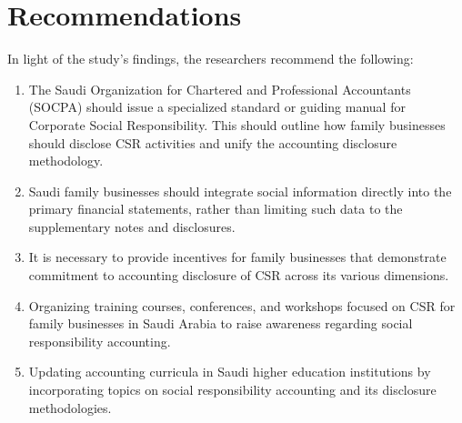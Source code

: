 \documentclass{NSP1}
\begin{document}
\section{Recommendations}
In light of the study's findings, the researchers recommend the following:
\begin{enumerate}
\item The Saudi Organization for Chartered and Professional Accountants (SOCPA) should issue a specialized standard or guiding manual for Corporate Social Responsibility. This should outline how family businesses should disclose CSR activities and unify the accounting disclosure methodology.
\item Saudi family businesses should integrate social information directly into the primary financial statements, rather than limiting such data to the supplementary notes and disclosures.
\item It is necessary to provide incentives for family businesses that demonstrate commitment to accounting disclosure of CSR across its various dimensions.
\item Organizing training courses, conferences, and workshops focused on CSR for family businesses in Saudi Arabia to raise awareness regarding social responsibility accounting.
\item Updating accounting curricula in Saudi higher education institutions by incorporating topics on social responsibility accounting and its disclosure methodologies.
\end{enumerate}
\end{document}
